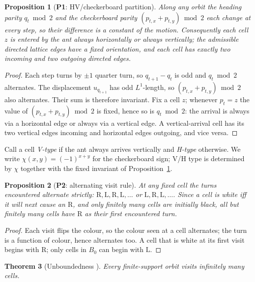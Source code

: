 \documentclass[11pt,reqno]{amsart}
\theoremstyle{plain}
\newtheorem{theorem}{Theorem}[section]
\newtheorem{proposition}[theorem]{Proposition}
\theoremstyle{definition}
\newcommand{\che}{\chi}                 %
\newcommand{\turnR}{\mathrm{R}}
\newcommand{\turnL}{\mathrm{L}}
\newcommand{\PN}[1]{\textbf{P#1}}
\begin{document}
\begin{proposition}[\PN{1}: HV/checkerboard partition]\label{prop:hv}
Along any orbit the heading parity $q_t\bmod 2$ and the checkerboard parity
$(p_{t,x}+p_{t,y})\bmod 2$ each change at every step, so their difference is a
constant of the motion. Consequently each cell $z$ is entered by the ant always
horizontally or always vertically; the admissible directed lattice edges have a
fixed orientation, and each cell has exactly two incoming and two outgoing
directed edges.
\end{proposition}

\begin{proof}
Each step turns by $\pm1$ quarter turn, so $q_{t+1}-q_t$ is odd and $q_t\bmod2$
alternates. The displacement $u_{q_{t+1}}$ has odd $L^1$-length, so
$(p_{t,x}+p_{t,y})\bmod 2$ also alternates. Their sum is therefore invariant.
Fix a cell $z$; whenever $p_t=z$ the value of $(p_{t,x}+p_{t,y})\bmod2$ is fixed,
hence so is $q_t\bmod2$: the arrival is always via a horizontal edge or always
via a vertical edge. A vertical-arrival cell has its two vertical edges incoming
and horizontal edges outgoing, and vice versa.
\end{proof}

Call a cell \emph{V-type} if the ant always arrives vertically and \emph{H-type}
otherwise. We write $\che(x,y)=(-1)^{x+y}$ for the checkerboard sign; V/H type is
determined by $\che$ together with the fixed invariant of
Proposition~\ref{prop:hv}.

\begin{proposition}[\PN{2}: alternating visit rule]\label{prop:alt}
At any fixed cell the turns encountered alternate strictly:
$\turnR,\turnL,\turnR,\turnL,\dots$ or $\turnL,\turnR,\turnL,\dots$. Since a cell
is white iff it will next cause an $\turnR$, and only finitely many cells are
initially black, all but finitely many cells have $\turnR$ as their first
encountered turn.
\end{proposition}

\begin{proof}
Each visit flips the colour, so the colour seen at a cell alternates; the turn
is a function of colour, hence alternates too. A cell that is white at its first
visit begins with $\turnR$; only cells in $B_0$ can begin with $\turnL$.
\end{proof}

\begin{theorem}[Unboundedness \cite{BunimovichTroubetzkoy1992}]\label{thm:unbdd}
Every finite-support orbit visits infinitely many cells.
\end{theorem}
\end{document}

